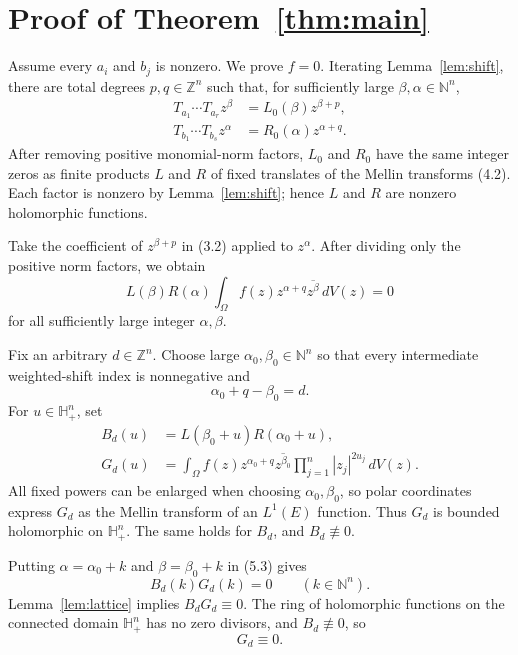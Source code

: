 \documentclass[11pt]{article}
\newcommand{\N}{\mathbb N}
\newcommand{\Z}{\mathbb Z}
\newcommand{\Hh}{\mathbb H_+}
\newcommand{\Om}{\Omega}
\begin{document}
\section{Proof of Theorem~\ref{thm:main}}

Assume every $a_i$ and $b_j$ is nonzero.  We prove $f=0$.
Iterating Lemma~\ref{lem:shift}, there are total degrees $p,q\in\Z^n$ such
that, for sufficiently large $\beta,\alpha\in\N^n$,
\begin{align}
 T_{a_1}\cdots T_{a_r}z^\beta&=L_0(\beta)z^{\beta+p},\tag{5.1}\\
 T_{b_1}\cdots T_{b_s}z^\alpha&=R_0(\alpha)z^{\alpha+q}.\tag{5.2}
\end{align}
After removing positive monomial-norm factors, $L_0$ and $R_0$ have the
same integer zeros as finite products $L$ and $R$ of fixed translates of
the Mellin transforms (4.2).  Each factor is nonzero by
Lemma~\ref{lem:shift}; hence $L$ and $R$ are nonzero holomorphic functions.

Take the coefficient of $z^{\beta+p}$ in (3.2) applied to $z^\alpha$.
After dividing only the positive norm factors, we obtain
\[
 L(\beta)R(\alpha)
 \int_\Om f(z)z^{\alpha+q}\overline{z^\beta}\,dV(z)=0              \tag{5.3}
\]
for all sufficiently large integer $\alpha,\beta$.

Fix an arbitrary $d\in\Z^n$.  Choose large
$\alpha_0,\beta_0\in\N^n$ so that every intermediate weighted-shift index is
nonnegative and
\[
 \alpha_0+q-\beta_0=d.                                \tag{5.4}
\]
For $u\in\Hh^n$, set
\begin{align}
 B_d(u)&=L(\beta_0+u)R(\alpha_0+u),                   \tag{5.5}\\
 G_d(u)&=\int_\Om f(z)z^{\alpha_0+q}
          \overline{z^{\beta_0}}\prod_{j=1}^n|z_j|^{2u_j}\,dV(z).
                                                                    \tag{5.6}
\end{align}
All fixed powers can be enlarged when choosing $\alpha_0,\beta_0$, so polar
coordinates express $G_d$ as the Mellin transform of an $L^1(E)$ function.
Thus $G_d$ is bounded holomorphic on $\Hh^n$.  The same holds for $B_d$, and
$B_d\not\equiv0$.

Putting $\alpha=\alpha_0+k$ and $\beta=\beta_0+k$ in (5.3) gives
\[
 B_d(k)G_d(k)=0\qquad(k\in\N^n).                      \tag{5.7}
\]
Lemma~\ref{lem:lattice} implies $B_dG_d\equiv0$.  The ring of holomorphic
functions on the connected domain $\Hh^n$ has no zero divisors, and
$B_d\not\equiv0$, so
\[
 G_d\equiv0.                                          \tag{5.8}
\]
\end{document}
